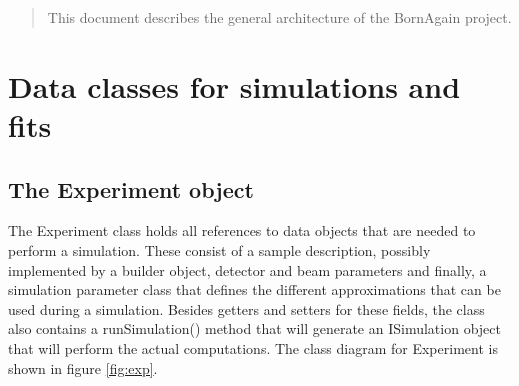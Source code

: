 \documentclass[a4paper,10pt]{article}
\title{}
\author{}
\newcommand{\reffig}[1]{figure \ref{fig:#1}}
\begin{document}

\begin{abstract}
This document describes the general architecture of the BornAgain project.
\end{abstract}

\section{Data classes for simulations and fits}
\subsection{The Experiment object}
The Experiment class holds all references to data objects that are needed to perform a simulation. These consist of a sample description, possibly implemented by a builder object, detector and beam parameters and finally, a simulation parameter class that defines the different approximations that can be used during a simulation. Besides getters and setters for these fields, the class also contains a runSimulation() method that will generate an ISimulation object that will perform the actual computations. The class diagram for Experiment is shown in \reffig{exp}.
\end{document}
